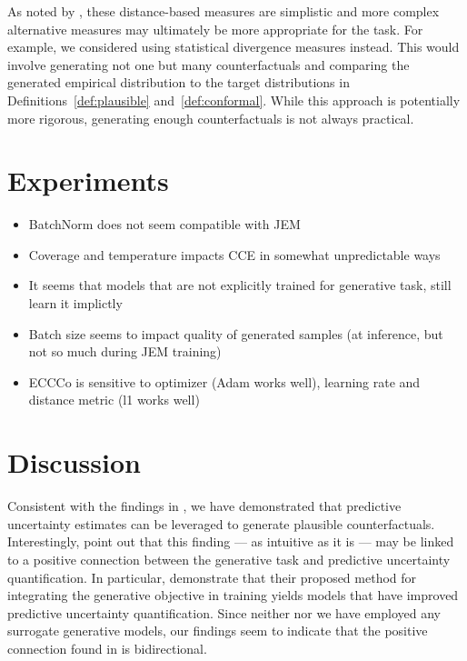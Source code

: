 \documentclass{article}
\begin{document}
As noted by \citet{guidotti2022counterfactual}, these distance-based measures are simplistic and more complex alternative measures may ultimately be more appropriate for the task. For example, we considered using statistical divergence measures instead. This would involve generating not one but many counterfactuals and comparing the generated empirical distribution to the target distributions in Definitions~\ref{def:plausible} and~\ref{def:conformal}. While this approach is potentially more rigorous, generating enough counterfactuals is not always practical. 

\section{Experiments}

\begin{itemize}
  \item BatchNorm does not seem compatible with JEM
  \item Coverage and temperature impacts CCE in somewhat unpredictable ways
  \item It seems that models that are not explicitly trained for generative task, still learn it implictly
  \item Batch size seems to impact quality of generated samples (at inference, but not so much during JEM training)
  \item ECCCo is sensitive to optimizer (Adam works well), learning rate and distance metric (l1 works well)
\end{itemize}

\section{Discussion}

Consistent with the findings in \citet{schut2021generating}, we have demonstrated that predictive uncertainty estimates can be leveraged to generate plausible counterfactuals. Interestingly, \citet{schut2021generating} point out that this finding --- as intuitive as it is --- may be linked to a positive connection between the generative task and predictive uncertainty quantification. In particular, \citet{grathwohl2020your} demonstrate that their proposed method for integrating the generative objective in training yields models that have improved predictive uncertainty quantification. Since neither \citet{schut2021generating} nor we have employed any surrogate generative models, our findings seem to indicate that the positive connection found in \citet{grathwohl2020your} is bidirectional.
\end{document}
